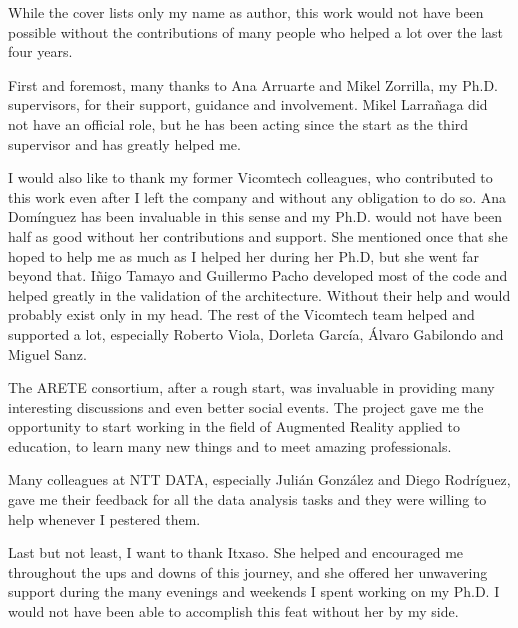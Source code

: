 


\begin{acknowledgementslong} 

While the cover lists only my name as author, this work would not have been possible without the contributions of many people who helped a lot over the last four years.

First and foremost, many thanks to Ana Arruarte and Mikel Zorrilla, my Ph.D. supervisors, for their support, guidance and involvement. Mikel Larrañaga did not have an official role, but he has been acting since the start as the third supervisor and has greatly helped me.

I would also like to thank my former Vicomtech colleagues, who contributed to this work even after I left the company and without any obligation to do so. Ana Domínguez has been invaluable in this sense and my Ph.D. would not have been half as good without her contributions and support. She mentioned once that she hoped to help me as much as I helped her during her Ph.D, but she went far beyond that. Iñigo Tamayo and Guillermo Pacho developed most of the code and helped greatly in the validation of the architecture. Without their help \arch{} and \appname{} would probably exist only in my head. The rest of the Vicomtech team helped and supported a lot, especially Roberto Viola, Dorleta García, Álvaro Gabilondo and Miguel Sanz. 

The ARETE consortium, after a rough start, was invaluable in providing many interesting discussions and even better social events. The project gave me the opportunity to start working in the field of Augmented Reality applied to education, to learn many new things and to meet amazing professionals.

Many colleagues at NTT DATA, especially Julián González and Diego Rodríguez, gave me their feedback for all the data analysis tasks and they were willing to help whenever I pestered them.

Last but not least, I want to thank Itxaso. She helped and encouraged me throughout the ups and downs of this journey, and she offered her unwavering support during the many evenings and weekends I spent working on my Ph.D. I would not have been able to accomplish this feat without her by my side.


\end{acknowledgementslong}
